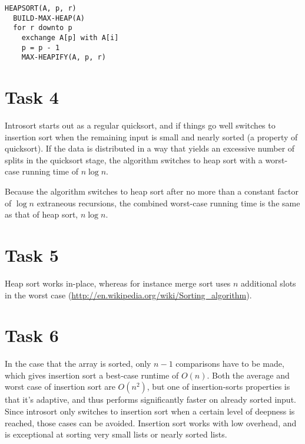 \documentclass[paper=a4, fleqn]{article}
\begin{document}
\begin{lstlisting}
HEAPSORT(A, p, r)
  BUILD-MAX-HEAP(A)
  for r downto p
    exchange A[p] with A[i]
    p = p - 1
    MAX-HEAPIFY(A, p, r)
\end{lstlisting}

\section*{Task 4}

Introsort starts out as a regular quicksort, and if things go well switches to
insertion sort when the remaining input is small and nearly sorted (a property
of quicksort). If the data is distributed in a way that yields an excessive
number of splits in the quicksort stage, the algorithm switches to heap sort
with a worst-case running time of $n\log n$.

Because the algorithm switches to heap sort after no more than a constant factor
of $\log n$ extraneous recursions, the combined worst-case running time is the
same as that of heap sort, $n\log n$.

\section*{Task 5}

Heap sort works in-place, whereas for instance merge sort uses $n$ additional
slots in the worst case (\url{http://en.wikipedia.org/wiki/Sorting_algorithm}).

\section*{Task 6}

In the case that the array is sorted, only $n-1$ comparisons have to be made,
which gives insertion sort a best-case runtime of $O(n)$. Both the average and
worst case of insertion sort are $O(n^2)$, but one of insertion-sorts properties
is that it's adaptive, and thus performs significantly faster on already sorted
input. Since introsort only switches to insertion sort when a certain level of
deepness is reached, those cases can be avoided. Insertion sort works with low
overhead, and is exceptional at sorting very small lists or nearly sorted lists.
\end{document}
